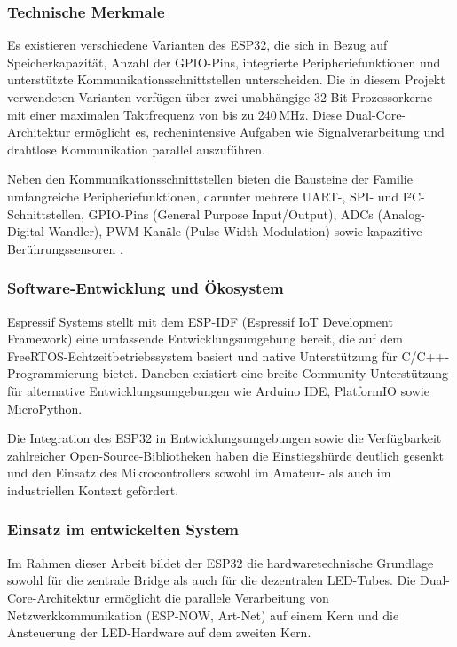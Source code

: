 \subsubsection{Technische Merkmale}
\label{subsubsec:esp32-merkmale}

Es existieren verschiedene Varianten des ESP32, die sich in Bezug auf Speicherkapazität, Anzahl der GPIO-Pins,
integrierte Peripheriefunktionen und unterstützte Kommunikationsschnittstellen unterscheiden.
Die in diesem Projekt verwendeten Varianten verfügen über zwei unabhängige 32-Bit-Prozessorkerne mit einer maximalen 
Taktfrequenz von bis zu 240\,MHz. Diese Dual-Core-Architektur ermöglicht es, 
rechenintensive Aufgaben wie Signalverarbeitung und drahtlose Kommunikation parallel 
auszuführen.

Neben den Kommunikationsschnittstellen bieten die Bausteine der Familie umfangreiche 
Peripheriefunktionen, darunter mehrere UART-, SPI- und I²C-Schnittstellen, 
GPIO-Pins (General Purpose Input/Output), ADCs (Analog-Digital-Wandler), PWM-Kanäle 
(Pulse Width Modulation) sowie kapazitive Berührungssensoren \cite{espressif_esp32}. 

\subsubsection{Software-Entwicklung und Ökosystem}
\label{subsubsec:esp32-software}

Espressif Systems stellt mit dem ESP-IDF (Espressif IoT Development Framework) eine 
umfassende Entwicklungsumgebung bereit, die auf dem FreeRTOS-Echtzeitbetriebssystem 
basiert und native Unterstützung für C/C++-Programmierung bietet. Daneben existiert eine 
breite Community-Unterstützung für alternative Entwicklungsumgebungen wie Arduino IDE, 
PlatformIO sowie MicroPython.

Die Integration des ESP32 in Entwicklungsumgebungen sowie die Verfügbarkeit 
zahlreicher Open-Source-Bibliotheken haben die Einstiegshürde deutlich gesenkt und den 
Einsatz des Mikrocontrollers sowohl im Amateur- als auch im industriellen Kontext 
gefördert.

\subsubsection{Einsatz im entwickelten System}
\label{subsubsec:esp32-system}

Im Rahmen dieser Arbeit bildet der ESP32 die hardwaretechnische Grundlage sowohl für die 
zentrale Bridge als auch für die dezentralen LED-Tubes. Die Dual-Core-Architektur 
ermöglicht die parallele Verarbeitung von Netzwerkkommunikation (ESP-NOW, Art-Net) auf 
einem Kern und die Ansteuerung der LED-Hardware auf dem zweiten Kern.

